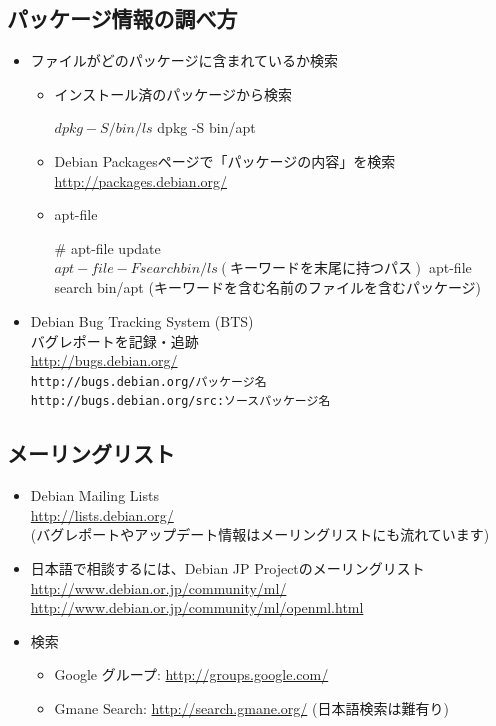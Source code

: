 \documentclass[mingoth,a4paper]{jsarticle}
\begin{document}
\subsection{パッケージ情報の調べ方}

\begin{itemize}
 \item ファイルがどのパッケージに含まれているか検索
       \begin{itemize}
	\item インストール済のパッケージから検索
\begin{commandline}
$ dpkg -S /bin/ls
$ dpkg -S bin/apt
\end{commandline}
 \item Debian Packagesページで「パッケージの内容」を検索\\
 \url{http://packages.debian.org/}
 \item apt-file
\begin{commandline}
# apt-file update
$ apt-file -F search bin/ls
  (キーワードを末尾に持つパス)
$ apt-file search bin/apt
  (キーワードを含む名前のファイルを含むパッケージ)
\end{commandline}
\end{itemize}

\item Debian Bug Tracking System (BTS)\\
バグレポートを記録・追跡\\
\url{http://bugs.debian.org/}\\
\verb|http://bugs.debian.org/パッケージ名|\\
\verb|http://bugs.debian.org/src:ソースパッケージ名|
\end{itemize}

\subsection{メーリングリスト}
\begin{itemize}
\item Debian Mailing Lists\\
\url{http://lists.debian.org/}\\
(バグレポートやアップデート情報はメーリングリストにも流れています)

\item 日本語で相談するには、Debian JP Projectのメーリングリスト\\
\url{http://www.debian.or.jp/community/ml/}\\
\url{http://www.debian.or.jp/community/ml/openml.html}

\item 検索
 \begin{itemize}
 \item Google グループ: \url{http://groups.google.com/}
 \item Gmane Search: \url{http://search.gmane.org/} (日本語検索は難有り)
 \end{itemize}
\end{itemize}
\end{document}
